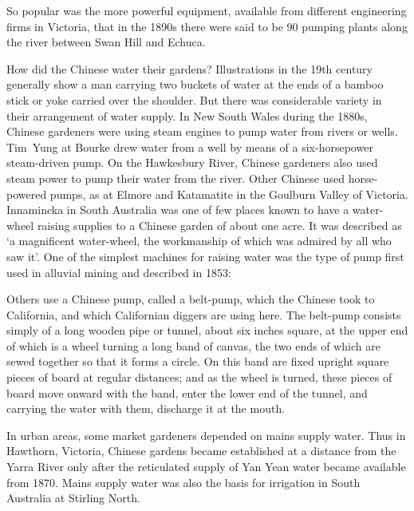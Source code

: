 So popular was the more powerful equipment, available from different
engineering firms in Victoria, that in the 1890s there were said to be
90 pumping plants along the river between Swan Hill and
Echuca.

How did the Chinese  water their gardens?
Illustrations in the 19th century generally show a man carrying two
buckets of water at the ends of a bamboo stick or yoke carried over
the shoulder.  But there was considerable variety in their arrangement
of water supply.  In New South Wales during the 1880s, Chinese
gardeners were using steam engines to pump water from rivers or wells.
Tim~Yung at Bourke drew water from a well by means of a six-horsepower
steam-driven pump.  On the
Hawkesbury River,  Chinese gardeners also used
steam power to pump their water from the river.  Other
Chinese used horse-powered pumps,
 as at Elmore and Katamatite in
the Goulburn Valley  of Victoria.  Innamincka
 in South Australia was one of few places known
to have a water-wheel  raising supplies
to a Chinese garden of about one acre.  It was described as `a
magnificent water-wheel, the workmanship of which was admired by all
who saw it'.  One of the
simplest machines for raising water was the type of pump
 first used in alluvial mining and
described in 1853:
\begin{Quote}	
	Others use a Chinese pump, called a belt-pump, which the
	Chinese took to California, and which
	Californian diggers are using here.  The belt-pump consists
	simply of a long wooden pipe or
	tunnel, about six inches square, at the upper end of which is
	a wheel turning a long band of canvas, the two ends of which
	are sewed together so that it forms a circle.  On this band
	are fixed upright square pieces of board at regular distances;
	and as the wheel is turned, these pieces of board move onward
	with the band, enter the lower end of the tunnel, and carrying
	the water with them, discharge it at the
	mouth.
\end{Quote}

In urban areas, some market gardeners depended on
mains supply water.  Thus in
Haw\-th\-orn,  Victoria, Chinese gardens became
established at a distance from the Yarra River 
only after the reticulated supply of Yan Yean  water became available from 1870.  Mains supply water was also
the basis for irrigation in South Australia at
Stirling 
North.

